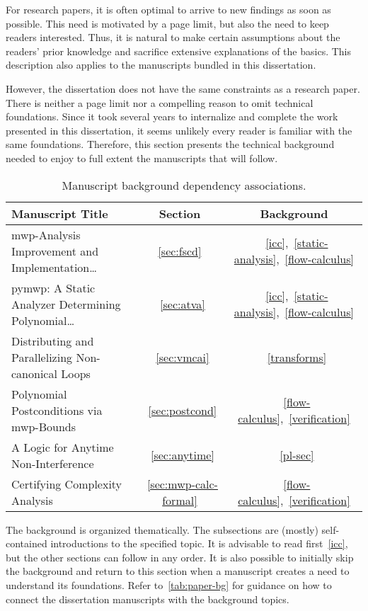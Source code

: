 For research papers, it is often optimal to arrive to new findings as soon as
possible. This need is motivated by a page limit, but also the need to keep
readers interested. Thus, it is natural to make certain assumptions about the
readers' prior knowledge and sacrifice extensive explanations of the basics.
This description also applies to the manuscripts bundled in this dissertation.

However, the dissertation does not have the same constraints as a research
paper. There is neither a page limit nor a compelling reason to omit technical
foundations. Since it took several years to internalize and complete the work
presented in this dissertation, it seems unlikely every reader is familiar with
the same foundations. Therefore, this section presents the technical background
needed to enjoy to full extent the manuscripts that will follow.

\begin{table}[h!]
\begin{NiceTabularX}{\linewidth}{@{}Xcc@{}}
\toprule
\textbf{Manuscript Title} & \textbf{Section} & \textbf{Background} \\
\midrule
{mwp-Analysis Improvement and Implementation\ldots}
    & \ref{sec:fscd}
    &~\ref{icc},~\ref{static-analysis},~\ref{flow-calculus} \\
{pymwp: A Static Analyzer Determining Polynomial\ldots}
    &~\ref{sec:atva}
    &~\ref{icc},~\ref{static-analysis},~\ref{flow-calculus} \\
{Distributing and Parallelizing Non-canonical Loops}
    &~\ref{sec:vmcai}
    &~\ref{transforms} \\
{Polynomial Postconditions via mwp-Bounds}
    &~\ref{sec:postcond}
    &~\ref{flow-calculus},~\ref{verification} \\
{A Logic for Anytime Non-Interference}
    &~\ref{sec:anytime}
    &~\ref{pl-sec} \\
{Certifying Complexity Analysis}
    &~\ref{sec:mwp-calc-formal}
    &~\ref{flow-calculus},~\ref{verification} \\
\bottomrule
\end{NiceTabularX}
\caption[Manuscript background dependency associations]
{Manuscript background dependency associations.}
\label{tab:paper-bg}
\end{table}

The background is organized thematically. The subsections are (mostly)
self-contained introductions to the specified topic. It is advisable to read
first~\autoref{icc}, but the other sections can follow in any order. It is also
possible to initially skip the background and return to this section when a
manuscript creates a need to understand its foundations. Refer
to~\autoref{tab:paper-bg} for guidance on how to connect the dissertation
manuscripts with the background topics.
